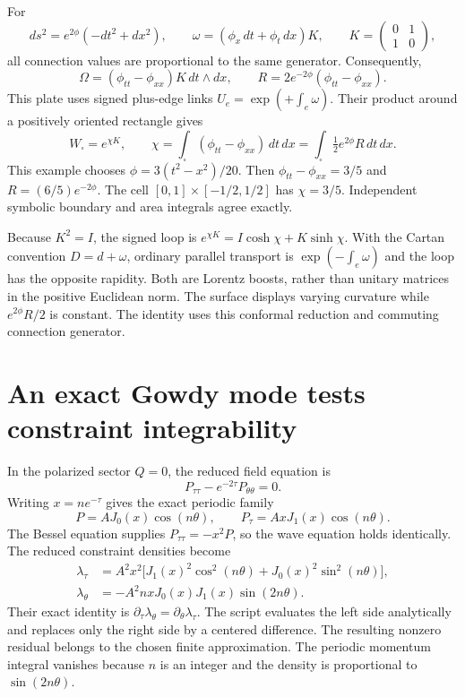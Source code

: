 For
\[
ds^2=e^{2\phi}(-dt^2+dx^2),\qquad
\omega=(\phi_x\,dt+\phi_t\,dx)K,
\qquad K=\begin{pmatrix}0&1\\1&0\end{pmatrix},
\]
all connection values are proportional to the same generator. Consequently,
\[
\Omega=(\phi_{tt}-\phi_{xx})K\,dt\wedge dx,
\qquad R=2e^{-2\phi}(\phi_{tt}-\phi_{xx}).
\]
This plate uses signed plus-edge links $U_e=\exp(+\int_e\omega)$. Their product around a positively oriented rectangle gives
\[
W_\square=e^{\chi K},\qquad
\chi=\int_\square(\phi_{tt}-\phi_{xx})\,dt\,dx
=\int_\square\tfrac12 e^{2\phi}R\,dt\,dx.
\]
This example chooses $\phi=3(t^2-x^2)/20$. Then $\phi_{tt}-\phi_{xx}=3/5$ and $R=(6/5)e^{-2\phi}$. The cell $[0,1]\times[-1/2,1/2]$ has $\chi=3/5$. Independent symbolic boundary and area integrals agree exactly.

Because $K^2=I$, the signed loop is $e^{\chi K}=I\cosh\chi+K\sinh\chi$. With the Cartan convention $D=d+\omega$, ordinary parallel transport is $\exp(-\int_e\omega)$ and the loop has the opposite rapidity. Both are Lorentz boosts, rather than unitary matrices in the positive Euclidean norm. The surface displays varying curvature while $e^{2\phi}R/2$ is constant. The identity uses this conformal reduction and commuting connection generator.



\clearpage
\section{An exact Gowdy mode tests constraint integrability}

In the polarized sector $Q=0$, the reduced field equation is
\[
P_{\tau\tau}-e^{-2\tau}P_{\theta\theta}=0.
\]
Writing $x=ne^{-\tau}$ gives the exact periodic family
\[
P=A J_0(x)\cos(n\theta),\qquad
P_\tau=A xJ_1(x)\cos(n\theta).
\]
The Bessel equation supplies $P_{\tau\tau}=-x^2P$, so the wave equation holds identically. The reduced constraint densities become
\[
\begin{aligned}
\lambda_\tau&=A^2x^2\bigl[J_1(x)^2\cos^2(n\theta)
+J_0(x)^2\sin^2(n\theta)\bigr],\\
\lambda_\theta&=-A^2nxJ_0(x)J_1(x)\sin(2n\theta).
\end{aligned}
\]
Their exact identity is $\partial_\tau\lambda_\theta=\partial_\theta\lambda_\tau$. The script evaluates the left side analytically and replaces only the right side by a centered difference. The resulting nonzero residual belongs to the chosen finite approximation. The periodic momentum integral vanishes because $n$ is an integer and the density is proportional to $\sin(2n\theta)$.

